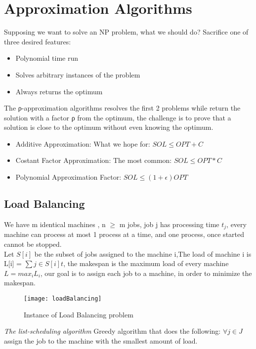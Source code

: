 \section{Approximation Algorithms}
Supposing we want to solve an NP problem, what we should do? Sacrifice one of three desired features:

\begin{itemize}
    \item{Polynomial time run}
    \item{Solves arbitrary instances of the problem}
    \item{Always returns the optimum}
\end{itemize}

The ρ-approximation algorithms resolves the first 2 problems while return the solution with a factor ρ from the optimum, the challenge is to prove that a solution is close to the optimum without even knowing the optimum.

\begin{itemize}
    \item{Additive Approximation}: What we hope for: $SOL \leq OPT + C$
    \item{Costant Factor Approximation}: The most common: $SOL \leq OPT * C$
    \item{Polynomial Approximation Factor}: $SOL \leq (1+\epsilon)OPT $
\end{itemize}

\subsection{Load Balancing}
We have m identical machines , n $\geq$ m jobs, job j has processing time $t_{j}$, every machine can process at most 1 process at a time, and one process, once started cannot be stopped.\\
Let $S[i]$ be the subset of jobs assigned to the machine i,The load of machine i is L[i] = $\sum j \in S[i] t$, the makespan is the maximum load of every machine $L=max_{i}L_{i}$, our goal is to assign each job to a machine, in order to minimize the makespan.

\begin{figure}[H]
    \centering
    \texttt{[image: loadBalancing]}
    \caption{Instance of Load Balancing problem}
\end{figure}

\emph{The list-scheduling algorithm}
Greedy algorithm that does the following: $\forall j \in J$ assign the job to the machine with the smallest amount of load.\\

